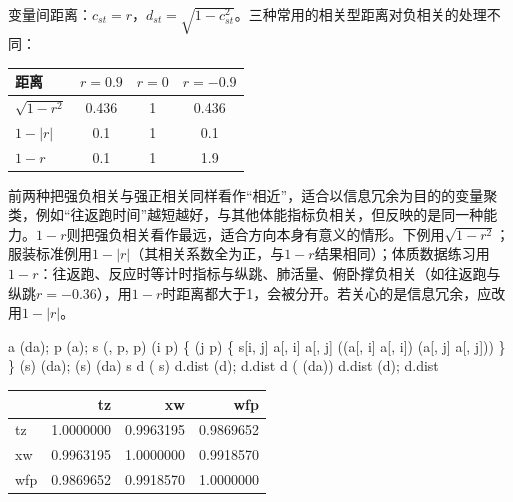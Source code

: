 变量间距离：$c_{st}=r$，$d_{st}=\sqrt{1-c_{st}^2}$。三种常用的相关型距离对负相关的处理不同：
\begin{center}\small\begin{tabular}{lccc}\toprule
{\bfseries 距离}&$r=0.9$&$r=0$&$r=-0.9$\\\midrule
$\sqrt{1-r^2}$&0.436&1&0.436\\
$1-|r|$&0.1&1&0.1\\
$1-r$&0.1&1&1.9\\\bottomrule
\end{tabular}\end{center}
前两种把强负相关与强正相关同样看作“相近”，适合以信息冗余为目的的变量聚类，例如“往返跑时间”越短越好，与其他体能指标负相关，但反映的是同一种能力。$1-r$则把强负相关看作最远，适合方向本身有意义的情形。下例用$\sqrt{1-r^2}$；服装标准例用$1-|r|$（其相关系数全为正，与$1-r$结果相同）；体质数据练习用$1-r$：往返跑、反应时等计时指标与纵跳、肺活量、俯卧撑负相关（如往返跑与纵跳$r=-0.36$），用$1-r$时距离都大于1，会被分开。若关心的是信息冗余，应改用$1-|r|$。
\begin{code}
a \ROperator{<-} (da); p \ROperator{<-} (a); s \ROperator{<-} (, p, p)
 (i  \ROperator{:}p) \{
   (j  \ROperator{:}p) \{
    s[i, j] \ROperator{<-} a[, i] \ROperator{\%*\%} a[, j] \ROperator{/}
      ((a[, i] \ROperator{\%*\%} a[, i]) \ROperator{*} (a[, j] \ROperator{\%*\%} a[, j]))
  \}
\}
(s) \ROperator{<-} (da); (s) \ROperator{<-} (da)
s
d \ROperator{<-} ( \ROperator{-} s\ROperator{\textasciicircum{}})
d.dist \ROperator{<-} (d); d.dist
d \ROperator{<-} ( \ROperator{-} (da)\ROperator{\textasciicircum{}})
d.dist \ROperator{<-} (d); d.dist
\end{code}
\par\addvspace{5pt}\begin{center}\begin{minipage}{\linewidth}\centering
\small
{}
\begin{tabular}{lrrr}\toprule
 &{\bfseries  tz }&{\bfseries  xw }&{\bfseries  wfp}\\\midrule
tz & 1.0000000 & 0.9963195 & 0.9869652\\
xw & 0.9963195 & 1.0000000 & 0.9918570\\
wfp & 0.9869652 & 0.9918570 & 1.0000000\\
\bottomrule\end{tabular}
\end{minipage}\end{center}
